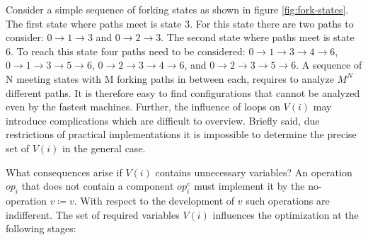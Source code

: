 \documentclass[12pt,a4paper]{scrartcl}
\begin{document}
Consider a simple sequence of forking states as shown in figure
\ref{fig:fork-states}.  The first state where paths meet is state 3. For this
state there are two paths to consider: $0 \rightarrow 1 \rightarrow 3$ and $0
\rightarrow 2 \rightarrow 3$.  The second state where paths meet is state 6. To
reach this state four paths need to be considered: $0 \rightarrow 1 \rightarrow
3 \rightarrow 4 \rightarrow 6$, $0 \rightarrow 1 \rightarrow 3 \rightarrow 5
\rightarrow 6$, $0 \rightarrow 2 \rightarrow 3 \rightarrow 4 \rightarrow 6$,
and $0 \rightarrow 2 \rightarrow 3 \rightarrow 5 \rightarrow 6$. A sequence of
N meeting states with M forking paths in between each, requires to analyze
$M^N$ different paths.  It is therefore easy to find configurations that cannot
be analyzed even by the fastest machines.  Further, the influence of loops on
$V(i)$ may introduce complications which are difficult to overview.  Briefly
said, due restrictions of practical implementations it is impossible to
determine the precise set of $V(i)$ in the general case. 

What consequences arise if $V(i)$ contains unnecessary variables?  An operation
$op_i$ that does not contain a component $op^v_i$ must implement it by the
no-operation $v\coloneqq v$. With respect to the development of $v$ such
operations are indifferent. The set of required variables $V(i)$ influences the
optimization at the following stages:
\end{document}
